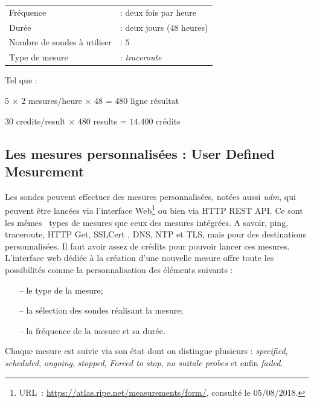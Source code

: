 \begin{table}[H]
	\begin{tabular}{ l l }
		Fréquence &: deux fois par heure \\ 
		Durée &: deux jours ($48$ heures) \\
		Nombre de sondes à utiliser&: $5$\\
		Type de mesure &: \textit{traceroute}\\
	\end{tabular}
\end{table}
Tel que :
\begin{tcolorbox}
	\begin{center}
		$5$ $\times$ $2$ mesures/heure $\times$ $48$ = $480$ ligne résultat
		
		$30$ credits/result $\times$ $480$ results = $14.400$ crédits
	\end{center}
\end{tcolorbox}	

\subsection{Les mesures personnalisées : User Defined Mesurement } \label{par:udm}
Les sondes  peuvent effectuer des mesures personnalisées,  notées aussi \textit{udm},  qui peuvent être lancées via l'interface Web\footnote{URL~: \url{https://atlas.ripe.net/measurements/form/}, consulté le $05/08/2018$.} ou bien via  HTTP REST API. %
Ce sont les m\^{e}mes~  types de mesures que ceux des mesures intégrées. A savoir, ping, traceroute,  HTTP Get, SSLCert , DNS, NTP et TLS, mais pour des destinations personnalisées.
Il faut avoir assez de crédits pour pouvoir lancer ces mesures. L'interface web dédiée à la création d'une nouvelle mesure offre toute les possibilités comme la personnalisation des éléments suivants :
\begin{itemize}
	\item[--] le type de la mesure;
	\item[--] la sélection des sondes réalisant la mesure;
	\item[--] la fréquence de la mesure et sa durée.
\end{itemize}
Chaque mesure est suivie via son état dont on distingue plusieurs  : \textit{specified}, \textit{scheduled}, \textit{ongoing}, \textit{stopped},  \textit{Forced to stop},  \textit{no suitale probes} et enfin  \textit{failed}.



